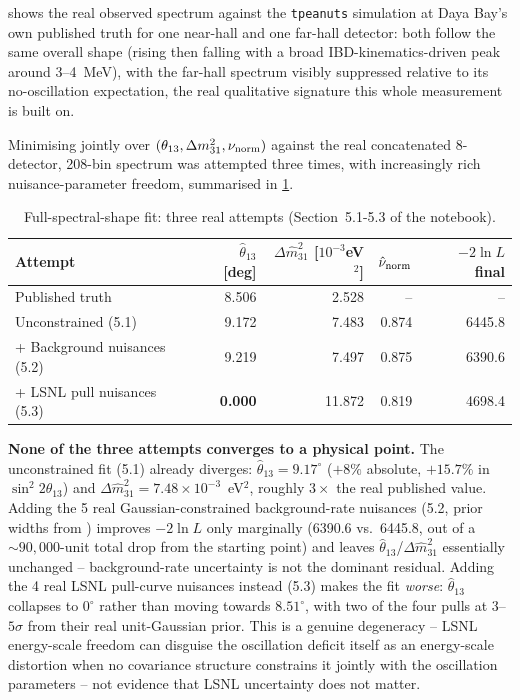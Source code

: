  shows the real observed spectrum
against the \texttt{tpeanuts} simulation at Daya Bay's own published
truth for one near-hall and one far-hall detector: both follow the same
overall shape (rising then falling with a broad IBD-kinematics-driven peak
around 3--4~MeV), with the far-hall spectrum visibly suppressed relative
to its no-oscillation expectation, the real qualitative signature this
whole measurement is built on.

Minimising  jointly over
$(\theta_{13},\Delta m^2_{31},\nu_{\rm norm})$ against the real
concatenated 8-detector, 208-bin spectrum was attempted three times, with
increasingly rich nuisance-parameter freedom, summarised in
\cref{tab:fullshape-attempts}.

\begin{table}[htb]
\centering
\caption{Full-spectral-shape fit: three real attempts (Section~5.1-5.3 of the notebook).}
\label{tab:fullshape-attempts}
\begin{tabular}{@{}lrrrr@{}}
\toprule
Attempt & $\hat\theta_{13}$ [deg] & $\Delta\hat m^2_{31}$ [$10^{-3}$eV$^2$] & $\hat\nu_{\rm norm}$ & $-2\ln L$ final \\
\midrule
Published truth & 8.506 & 2.528 & -- & -- \\
Unconstrained (5.1) & 9.172 & 7.483 & 0.874 & 6445.8 \\
+ Background nuisances (5.2) & 9.219 & 7.497 & 0.875 & 6390.6 \\
+ LSNL pull nuisances (5.3) & \textbf{0.000} & 11.872 & 0.819 & 4698.4 \\
\bottomrule
\end{tabular}
\end{table}

\begin{resultbox}
\textbf{None of the three attempts converges to a physical point.} The
unconstrained fit (5.1) already diverges: $\hat\theta_{13}=9.17^\circ$ ($+8\%$
absolute, $+15.7\%$ in $\sin^2 2\theta_{13}$) and
$\Delta\hat m^2_{31}=7.48\times10^{-3}$~eV$^2$, roughly $3\times$ the real
published value. Adding the 5 real Gaussian-constrained background-rate
nuisances (5.2, prior widths from ) improves
$-2\ln L$ only marginally (6390.6 vs.\ 6445.8, out of a $\sim90{,}000$-unit
total drop from the starting point) and leaves $\hat\theta_{13}$/$\Delta
\hat m^2_{31}$ essentially unchanged -- background-rate uncertainty is not
the dominant residual. Adding the 4 real LSNL pull-curve nuisances instead
(5.3) makes the fit \emph{worse}: $\hat\theta_{13}$ collapses to
$0^\circ$ rather than moving towards $8.51^\circ$, with two of the four
pulls at $3$--$5\sigma$ from their real unit-Gaussian prior. This is a
genuine degeneracy -- LSNL energy-scale freedom can disguise the
oscillation deficit itself as an energy-scale distortion when no
covariance structure constrains it jointly with the oscillation
parameters -- not evidence that LSNL uncertainty does not matter.
\end{resultbox}

